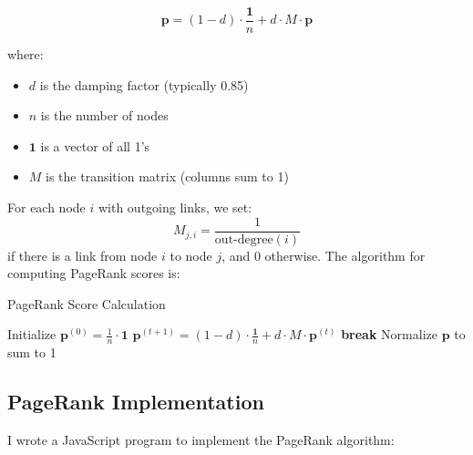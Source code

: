 \documentclass{article}
\begin{document}
\begin{equation}
\mathbf{p} = (1-d) \cdot \frac{\mathbf{1}}{n} + d \cdot M \cdot \mathbf{p}
\end{equation}

where:
\begin{itemize}
    \item $d$ is the damping factor (typically 0.85)
    \item $n$ is the number of nodes
    \item $\mathbf{1}$ is a vector of all 1's
    \item $M$ is the transition matrix (columns sum to 1)
\end{itemize}

For each node $i$ with outgoing links, we set:
\begin{equation}
M_{j,i} = \frac{1}{\text{out-degree}(i)}
\end{equation}
if there is a link from node $i$ to node $j$, and 0 otherwise. The algorithm for computing PageRank scores is:

\begin{algorithm}
\caption{PageRank Score Calculation}
\begin{algorithmic}[1]
\State Initialize $\mathbf{p}^{(0)} = \frac{1}{n} \cdot \mathbf{1}$
    \State $\mathbf{p}^{(t+1)} = (1-d) \cdot \frac{\mathbf{1}}{n} + d \cdot M \cdot \mathbf{p}^{(t)}$
        \State \textbf{break}
    \EndIf
\EndFor
\State Normalize $\mathbf{p}$ to sum to 1
\end{algorithmic}
\end{algorithm}

\subsection{PageRank Implementation}
I wrote a JavaScript program to implement the PageRank algorithm:
\end{document}
